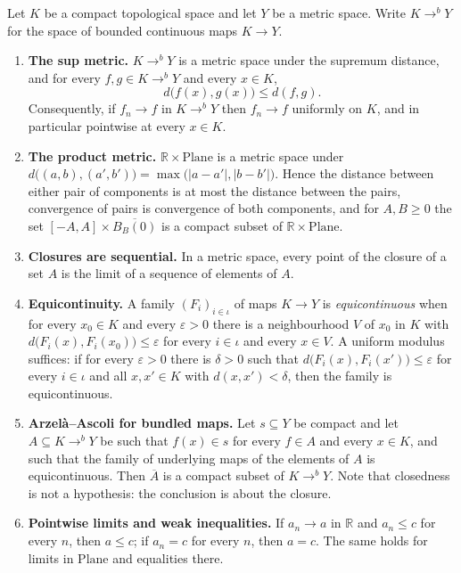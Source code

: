 \begin{proposition}
Let $K$ be a compact topological space and let $Y$ be a metric space.  Write $K\to^{b}Y$ for the
space of bounded continuous maps $K\to Y$.
\begin{enumerate}
\item \textbf{The sup metric.}  $K\to^{b}Y$ is a metric space under the supremum distance, and
for every $f,g\in K\to^{b}Y$ and every $x\in K$,
\[
  d\bigl(f(x),g(x)\bigr)\le d(f,g).
\]
Consequently, if $f_n\to f$ in $K\to^{b}Y$ then $f_n\to f$ uniformly on $K$, and in particular
pointwise at every $x\in K$.
\item \textbf{The product metric.}  $\mathbb{R}\times\mathrm{Plane}$ is a metric space under
$d\bigl((a,b),(a',b')\bigr)=\max\bigl(\lvert a-a'\rvert,\lvert b-b'\rvert\bigr)$.  Hence the
distance between either pair of components is at most the distance between the pairs,
convergence of pairs is convergence of both components, and for $A,B\ge0$ the set
$[-A,A]\times\overline{B_B(0)}$ is a compact subset of $\mathbb{R}\times\mathrm{Plane}$.
\item \textbf{Closures are sequential.}  In a metric space, every point of the closure of a set
$A$ is the limit of a sequence of elements of $A$.
\item \textbf{Equicontinuity.}  A family $(F_i)_{i\in\iota}$ of maps $K\to Y$ is
\emph{equicontinuous} when for every $x_0\in K$ and every $\varepsilon>0$ there is a
neighbourhood $V$ of $x_0$ in $K$ with $d\bigl(F_i(x),F_i(x_0)\bigr)\le\varepsilon$ for every
$i\in\iota$ and every $x\in V$.  A uniform modulus suffices: if for every $\varepsilon>0$ there
is $\delta>0$ such that $d\bigl(F_i(x),F_i(x')\bigr)\le\varepsilon$ for every $i\in\iota$ and all
$x,x'\in K$ with $d(x,x')<\delta$, then the family is equicontinuous.
\item \textbf{Arzel\`a--Ascoli for bundled maps.}  Let $s\subseteq Y$ be compact and let
$A\subseteq K\to^{b}Y$ be such that $f(x)\in s$ for every $f\in A$ and every $x\in K$, and such
that the family of underlying maps of the elements of $A$ is equicontinuous.  Then
$\overline{A}$ is a compact subset of $K\to^{b}Y$.  Note that closedness is not a hypothesis:
the conclusion is about the closure.
\item \textbf{Pointwise limits and weak inequalities.}  If $a_n\to a$ in $\mathbb{R}$ and
$a_n\le c$ for every $n$, then $a\le c$; if $a_n=c$ for every $n$, then $a=c$.  The same holds
for limits in $\mathrm{Plane}$ and equalities there.

\end{enumerate}
\end{proposition}
